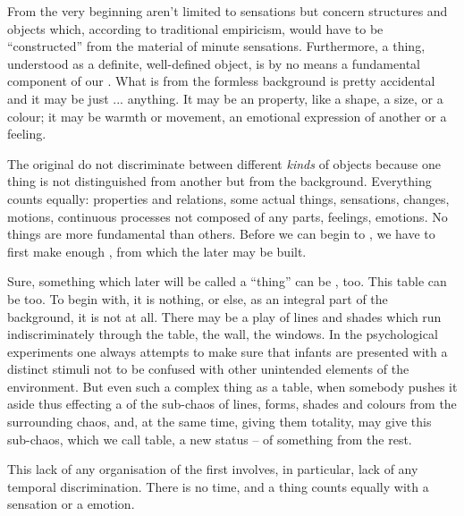 \pa From the very beginning  aren't limited to sensations but
concern structures and objects which, according to traditional empiricism, would
have to be ``constructed'' from the material of minute sensations.  Furthermore,
a {thing}, understood as a definite, well-defined object, is by no means a
fundamental component of our . What is  from the
formless background is pretty accidental and it may be just ... anything.  It
may be an  property, like a shape, a size, or a colour; it may be
warmth or movement, an emotional expression of another or a feeling.

The original  do not discriminate between different {\em kinds}
of objects because one thing is not distinguished from another but from the
background. Everything counts equally: properties and relations, some actual
{things}, sensations, changes, motions, continuous processes not composed of
any parts, feelings, emotions.  No things are more fundamental than others.
Before we can begin to , we have to first make enough
, from which the later  may be built.

Sure, something which later will be called a ``thing'' can be
, too. This table can be  too. To begin
with, it is nothing, or else, as an integral part of the background, it is not
at all. There may be a play of lines and shades which run indiscriminately
through the table, the wall, the windows. In the psychological experiments one
always attempts to make sure that infants are presented with a distinct stimuli
not to be confused with other unintended elements of the environment. But even
such a complex thing as a table, when somebody pushes it aside thus effecting a
 of the sub-chaos of lines, forms, shades and colours from the
surrounding chaos, and, at the same time, giving them totality, may give this
sub-chaos, which we call table, a new status -- of something  from
the rest.  

\pa This lack of any organisation of the first  involves, in
particular, lack of any temporal discrimination. There is no time, and a
 {thing} counts equally with a  sensation
or a  emotion.

